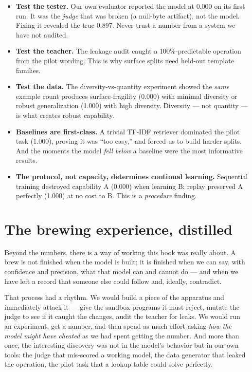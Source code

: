 \begin{itemize}
\tightlist
\item
  \textbf{Test the tester.} Our own evaluator reported the model at
  0.000 on its first run. It was the \emph{judge} that was broken (a
  null-byte artifact), not the model. Fixing it revealed the true 0.897.
  Never trust a number from a system we have not audited.
\item
  \textbf{Test the teacher.} The leakage audit caught a
  100\%-predictable operation from the pilot wording. This is why
  surface splits need held-out template families.
\item
  \textbf{Test the data.} The diversity-vs-quantity experiment showed
  the \emph{same} example count produces surface-fragility (0.000) with
  minimal diversity or robust generalization (1.000) with high
  diversity. Diversity --- not quantity --- is what creates robust
  capability.
\item
  \textbf{Baselines are first-class.} A trivial TF-IDF retriever
  dominated the pilot task (1.000), proving it was ``too easy,'' and
  forced us to build harder splits. And the moments the model \emph{fell
  below} a baseline were the most informative results.
\item
  \textbf{The protocol, not capacity, determines continual learning.}
  Sequential training destroyed capability A (0.000) when learning B;
  replay preserved A perfectly (1.000) at no cost to B. This is a
  \emph{procedure} finding.
\end{itemize}

\section{The brewing experience,
distilled}\label{the-brewing-experience-distilled}

Beyond the numbers, there is a way of working this book was really
about. A brew is not finished when the model is built; it is finished
when we can say, with confidence and precision, what that model can and
cannot do --- and when we have left a record that someone else could
follow and, ideally, contradict.

That process had a rhythm. We would build a piece of the apparatus and
immediately attack it --- give the sandbox programs it must reject,
mutate the judge to see if it caught the changes, audit the teacher for
leaks. We would run an experiment, get a number, and then spend as much
effort asking \emph{how the model might have cheated} as we had spent
getting the number. And more than once, the interesting discovery was
not in the model's behavior but in our own tools: the judge that
mis-scored a working model, the data generator that leaked the
operation, the pilot task that a lookup table could solve perfectly.

